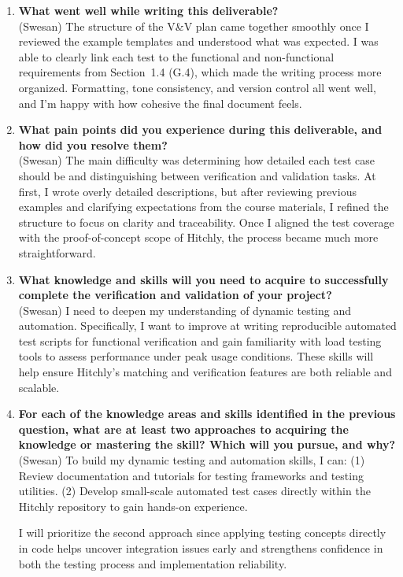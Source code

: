 \documentclass[12pt, titlepage]{article}
\begin{document}
\begin{enumerate}

\item \textbf{What went well while writing this deliverable?}\\
(Swesan) The structure of the V\&V plan came together smoothly once I reviewed the example templates and understood what was expected. I was able to clearly link each test to the functional and non-functional requirements from Section~1.4 (G.4), which made the writing process more organized. Formatting, tone consistency, and version control all went well, and I’m happy with how cohesive the final document feels.

\item \textbf{What pain points did you experience during this deliverable, and how did you resolve them?}\\
(Swesan) The main difficulty was determining how detailed each test case should be and distinguishing between verification and validation tasks. At first, I wrote overly detailed descriptions, but after reviewing previous examples and clarifying expectations from the course materials, I refined the structure to focus on clarity and traceability. Once I aligned the test coverage with the proof-of-concept scope of Hitchly, the process became much more straightforward.

\item \textbf{What knowledge and skills will you need to acquire to successfully complete the verification and validation of your project?}\\
(Swesan) I need to deepen my understanding of dynamic testing and automation. Specifically, I want to improve at writing reproducible automated test scripts for functional verification and gain familiarity with load testing tools to assess performance under peak usage conditions. These skills will help ensure Hitchly’s matching and verification features are both reliable and scalable.

\item \textbf{For each of the knowledge areas and skills identified in the previous question, what are at least two approaches to acquiring the knowledge or mastering the skill? Which will you pursue, and why?}\\
(Swesan) To build my dynamic testing and automation skills, I can:  
(1) Review documentation and tutorials for testing frameworks and testing utilities.  
(2) Develop small-scale automated test cases directly within the Hitchly repository to gain hands-on experience.  

I will prioritize the second approach since applying testing concepts directly in code helps uncover integration issues early and strengthens confidence in both the testing process and implementation reliability.

\end{enumerate}
\end{document}
